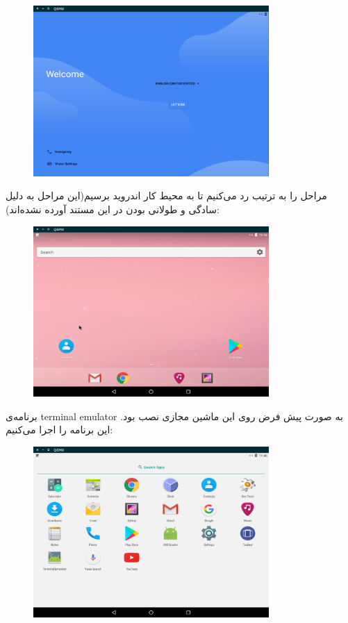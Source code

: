 \documentclass{article}
\begin{document}
\begin{figure}[h]
	\centering	
	\includegraphics[width = 0.8\textwidth]{images/install19.png}
\end{figure}

مراحل را به ترتیب رد می‌کنیم تا به محیط کار اندروید برسیم(این مراحل به دلیل سادگی و طولانی بودن در این مستند آورده نشده‌اند):

\newpage

\begin{figure}[h]
	\centering	
	\includegraphics[width = 0.8\textwidth]{images/install20.png}
\end{figure}

برنامه‌ی terminal emulator به صورت پیش فرض روی این ماشین مجازی نصب بود. این برنامه را اجرا می‌کنیم:

\begin{figure}[h]
	\centering	
	\includegraphics[width = 0.8\textwidth]{images/install21.png}
\end{figure}
\end{document}
